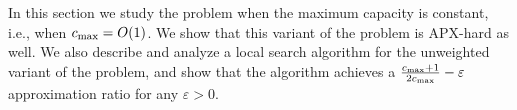 In this section we study the \carpool problem when the maximum
capacity is constant, i.e., when $c_{\max} = O(1)$.  We show that this
variant of the problem is APX-hard as well.  We also describe and
analyze a local search algorithm for the unweighted variant of the
problem, and show that the algorithm achieves a 
$\frac{c_{\max} + 1}{2c_{\max}} - \varepsilon$ approximation ratio for any
$\varepsilon > 0$.


